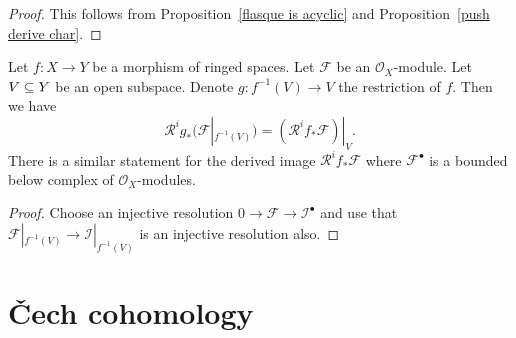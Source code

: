 \begin{proof}
This follows from Proposition~\ref{flasque is acyclic} and Proposition~\ref{push derive char}.
\end{proof}
\begin{proposition}
Let $f:X\to Y$ be a morphism of ringed spaces. Let $\mathscr{F}$ be an $\mathcal{O}_X$-module. Let $V\subseteq Y$ be an open subspace. Denote $g:f^{-1}(V)\to V$ the restriction of $f$. Then we have
\[\mathcal{R}^ig_*(\mathscr{F}|_{f^{-1}(V)})=(\mathcal{R}^if_*\mathscr{F})|_V.\]
There is a similar statement for the derived image $\mathcal{R}^if_*\mathscr{F}$ where $\mathscr{F}^\bullet$ is a bounded
below complex of $\mathcal{O}_X$-modules.
\end{proposition}
\begin{proof}
Choose an injective resolution $0\to\mathscr{F}\to\mathscr{I}^\bullet$ and use that $\mathscr{F}|_{f^{-1}(V)}\to\mathscr{I}|_{f^{-1}(V)}$ is an injective resolution also.
\end{proof}
\chapter{\v{C}ech cohomology}
